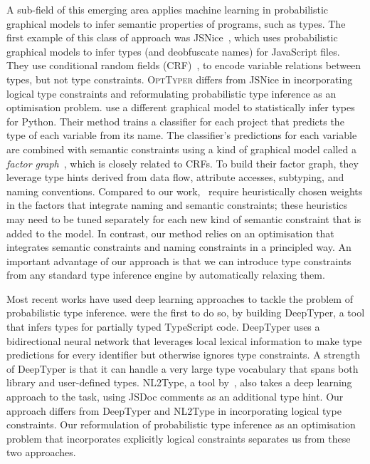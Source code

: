\documentclass[acmsmall, review, anonymous]{acmart}\settopmatter{printfolios=true,printccs=false,printacmref=false}
\newcommand{\projectname}{\textsc{OptTyper}\xspace}
\begin{document}
A sub-field of this emerging area applies machine learning in probabilistic graphical models to infer semantic properties of programs, such as types.
The first example of this class
of approach was
JSNice~\citep{raychev15}, which uses probabilistic graphical models to infer types (and deobfuscate names) for JavaScript files. 
They use conditional random fields (CRF)~\cite{sutton12}, to encode variable relations between types, but not type constraints. 
\projectname differs from JSNice in incorporating logical type constraints and reformulating  probabilistic type inference as an optimisation problem.
\citet{xu16} use a different  graphical model to statistically infer types for Python. 
Their method trains a
classifier for each project that predicts the
type of each variable from its name.
The classifier's predictions for each variable are combined with semantic constraints using a kind of graphical model called a \emph{factor graph}~\citep{yedidia2003}, which is
closely related to CRFs.
To build their factor graph, they leverage type hints
derived from data flow, attribute accesses, subtyping, and naming conventions. Compared to our work,~\citet{xu16} require
heuristically chosen weights in the factors that integrate naming and semantic constraints; these heuristics may need to be tuned separately for each new kind of semantic constraint that is added to the model. In contrast, our method relies on an optimisation that integrates semantic constraints
and naming constraints in a principled way.
An important advantage of our approach
is that we can introduce type constraints from any standard type inference engine by automatically relaxing them.

Most recent works have used deep learning approaches to tackle
the problem of probabilistic type inference.
\cite{hellendoorn18} were the first to do so, by building 
DeepTyper, a tool that infers types for partially typed TypeScript code. DeepTyper uses a bidirectional neural network that leverages local lexical information to make type predictions for every identifier but otherwise ignores type constraints. 
A strength of DeepTyper is that it can handle a very large type vocabulary that spans both library and user-defined types.
NL2Type, a tool by~\cite{malik19}, also takes
a deep learning approach to the task, using JSDoc comments as an additional type hint.
Our approach differs from DeepTyper and NL2Type in  incorporating logical type constraints.
Our reformulation of probabilistic type inference as an optimisation problem that incorporates explicitly logical constraints separates us from these two approaches.
\end{document}
